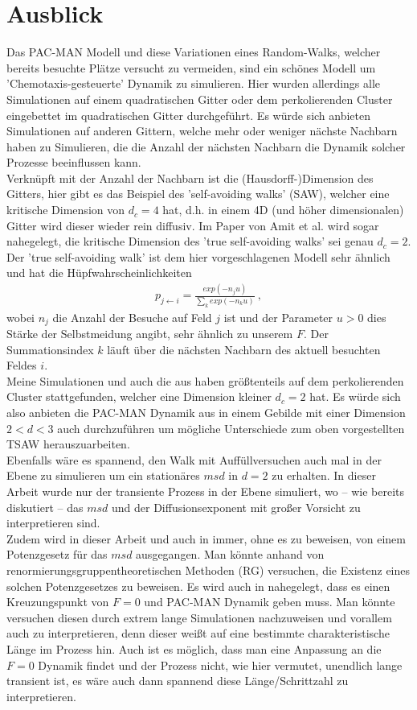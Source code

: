 \documentclass[a4paper, 12pt]{report}
\begin{document}
\section{Ausblick}
Das PAC-MAN Modell und diese Variationen eines Random-Walks, welcher bereits besuchte Plätze versucht zu vermeiden, sind ein schönes Modell um 'Chemotaxis-gesteuerte' Dynamik zu simulieren. Hier wurden allerdings alle Simulationen auf einem quadratischen Gitter oder dem perkolierenden Cluster eingebettet im quadratischen Gitter durchgeführt. Es würde sich anbieten Simulationen auf anderen Gittern, welche mehr oder weniger nächste Nachbarn haben zu Simulieren, die die Anzahl der nächsten Nachbarn die Dynamik solcher Prozesse beeinflussen kann.
\\
Verknüpft mit der Anzahl der Nachbarn ist die (Hausdorff-)Dimension des Gitters, hier gibt es das Beispiel des 'self-avoiding walks' (SAW), welcher eine kritische Dimension von $d_c=4$ hat, d.h. in einem 4D (und höher dimensionalen) Gitter wird dieser wieder rein diffusiv. Im Paper von Amit et al. \cite{PhysRevB.27.1635} wird sogar nahegelegt, die kritische Dimension des 'true self-avoiding walks' sei genau $d_c=2$. Der 'true self-avoiding walk' ist dem hier vorgeschlagenen Modell sehr ähnlich und hat die Hüpfwahrscheinlichkeiten
\begin{align*}
p_{j \leftarrow i} = \frac{exp({-n_j u})}{\sum_k exp({-n_k u})}\ ,
\end{align*}
wobei $n_j$ die Anzahl der Besuche auf Feld $j$ ist und der Parameter $u>0$ dies Stärke der Selbstmeidung angibt, sehr ähnlich zu unserem $F$. Der Summationsindex $k$ läuft über die nächsten Nachbarn des aktuell besuchten Feldes $i$.
\\
Meine Simulationen und auch die aus \cite{doi:10.1063/1.4999485} haben größtenteils auf dem perkolierenden Cluster stattgefunden, welcher eine Dimension kleiner $d_c=2$ hat. Es würde sich also anbieten die PAC-MAN Dynamik aus \cite{doi:10.1063/1.4999485} in einem Gebilde mit einer Dimension $2<d<3$ auch durchzuführen um mögliche Unterschiede zum oben vorgestellten TSAW herauszuarbeiten.
\\
Ebenfalls wäre es spannend, den Walk mit Auffüllversuchen auch mal in der Ebene zu simulieren um ein stationäres $msd$ in $d=2$ zu erhalten. In dieser Arbeit wurde nur der transiente Prozess in der Ebene simuliert, wo -- wie bereits diskutiert -- das $msd$ und der Diffusionsexponent mit großer Vorsicht zu interpretieren sind.
\\
Zudem wird in dieser Arbeit und auch in \cite{doi:10.1063/1.4999485} immer, ohne es zu beweisen, von einem Potenzgesetz für das $msd$ ausgegangen. Man könnte anhand von renormierungsgruppentheoretischen Methoden (RG) versuchen, die Existenz eines solchen Potenzgesetzes zu beweisen. Es wird auch in \cite{doi:10.1063/1.4999485} nahegelegt, dass es einen Kreuzungspunkt von $F=0$ und PAC-MAN Dynamik geben muss. Man könnte versuchen diesen durch extrem lange Simulationen nachzuweisen und vorallem auch zu interpretieren, denn dieser weißt auf eine bestimmte charakteristische Länge im Prozess hin. Auch ist es möglich, dass man eine Anpassung an die $F=0$ Dynamik findet und der Prozess nicht, wie hier vermutet, unendlich lange transient ist, es wäre auch dann spannend diese Länge/Schrittzahl zu interpretieren.
\end{document}
